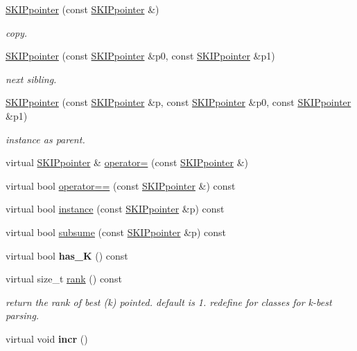 \begin{DoxyCompactItemize}
\mbox{\hyperlink{group__table_ga3366b26b81c9cb040716918f7d375879}{S\+K\+I\+Ppointer}} (const \mbox{\hyperlink{classSKIPpointer}{S\+K\+I\+Ppointer}} \&)
\begin{DoxyCompactList}\small\item\em copy. \end{DoxyCompactList}\item 
\mbox{\hyperlink{group__table_ga5dd0fd6fd23ca132973ec5f76a7f568d}{S\+K\+I\+Ppointer}} (const \mbox{\hyperlink{classSKIPpointer}{S\+K\+I\+Ppointer}} \&p0, const \mbox{\hyperlink{classSKIPpointer}{S\+K\+I\+Ppointer}} \&p1)
\begin{DoxyCompactList}\small\item\em next sibling. \end{DoxyCompactList}\item 
\mbox{\hyperlink{group__table_ga8b87b18aa76b4021da6d3421c738b002}{S\+K\+I\+Ppointer}} (const \mbox{\hyperlink{classSKIPpointer}{S\+K\+I\+Ppointer}} \&p, const \mbox{\hyperlink{classSKIPpointer}{S\+K\+I\+Ppointer}} \&p0, const \mbox{\hyperlink{classSKIPpointer}{S\+K\+I\+Ppointer}} \&p1)
\begin{DoxyCompactList}\small\item\em instance as parent. \end{DoxyCompactList}\item 
virtual \mbox{\hyperlink{classSKIPpointer}{S\+K\+I\+Ppointer}} \& \mbox{\hyperlink{group__table_ga54d7c5b3e7aa20e48ff8d15e9e0895f4}{operator=}} (const \mbox{\hyperlink{classSKIPpointer}{S\+K\+I\+Ppointer}} \&)
\item 
virtual bool \mbox{\hyperlink{group__table_ga4ecc91594489358cf7abdbf8cfd245a4}{operator==}} (const \mbox{\hyperlink{classSKIPpointer}{S\+K\+I\+Ppointer}} \&) const
\item 
virtual bool \mbox{\hyperlink{group__table_gaa9ccc9cf48974dca2a09ca4aa6092d43}{instance}} (const \mbox{\hyperlink{classSKIPpointer}{S\+K\+I\+Ppointer}} \&p) const
\item 
virtual bool \mbox{\hyperlink{group__table_gaacf829ba5696414bdcc753e97e76a7f1}{subsume}} (const \mbox{\hyperlink{classSKIPpointer}{S\+K\+I\+Ppointer}} \&p) const
\item 
\mbox{\label{classSKIPpointer_aec99858a74fb6a7b15975d3e65f79c31}} 
virtual bool {\bfseries has\+\_\+K} () const
\item 
\mbox{\label{classSKIPpointer_a9c89c0ff929c37399870880fb448de98}} 
virtual size\+\_\+t \mbox{\hyperlink{classSKIPpointer_a9c89c0ff929c37399870880fb448de98}{rank}} () const
\begin{DoxyCompactList}\small\item\em return the rank of best (k) pointed. default is 1. redefine for classes for k-\/best parsing. \end{DoxyCompactList}\item 
virtual void {\bfseries incr} ()
\end{DoxyCompactItemize}
